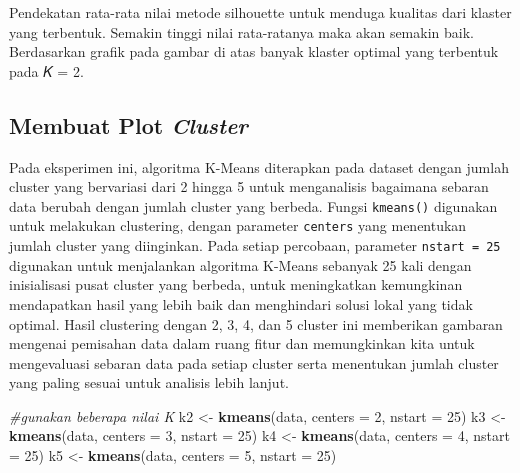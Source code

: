 \documentclass[
  oneside]{book}
\newenvironment{Shaded}{\begin{snugshade}}{\end{snugshade}}
\newcommand{\AttributeTok}[1]{\textcolor[rgb]{0.13,0.29,0.53}{#1}}
\newcommand{\CommentTok}[1]{\textcolor[rgb]{0.56,0.35,0.01}{\textit{#1}}}
\newcommand{\DecValTok}[1]{\textcolor[rgb]{0.00,0.00,0.81}{#1}}
\newcommand{\FunctionTok}[1]{\textcolor[rgb]{0.13,0.29,0.53}{\textbf{#1}}}
\newcommand{\NormalTok}[1]{#1}
\newcommand{\OtherTok}[1]{\textcolor[rgb]{0.56,0.35,0.01}{#1}}
\begin{document}
Pendekatan rata-rata nilai metode silhouette untuk menduga kualitas dari klaster yang terbentuk. Semakin tinggi nilai rata-ratanya maka akan semakin baik. Berdasarkan grafik pada gambar di atas banyak klaster optimal yang terbentuk pada 𝐾 = 2.

\subsection*{\texorpdfstring{Membuat Plot \emph{Cluster}}{Membuat Plot Cluster}}\label{membuat-plot-cluster}

Pada eksperimen ini, algoritma K-Means diterapkan pada dataset dengan jumlah cluster yang bervariasi dari 2 hingga 5 untuk menganalisis bagaimana sebaran data berubah dengan jumlah cluster yang berbeda. Fungsi \texttt{kmeans()} digunakan untuk melakukan clustering, dengan parameter \texttt{centers} yang menentukan jumlah cluster yang diinginkan. Pada setiap percobaan, parameter \texttt{nstart\ =\ 25} digunakan untuk menjalankan algoritma K-Means sebanyak 25 kali dengan inisialisasi pusat cluster yang berbeda, untuk meningkatkan kemungkinan mendapatkan hasil yang lebih baik dan menghindari solusi lokal yang tidak optimal. Hasil clustering dengan 2, 3, 4, dan 5 cluster ini memberikan gambaran mengenai pemisahan data dalam ruang fitur dan memungkinkan kita untuk mengevaluasi sebaran data pada setiap cluster serta menentukan jumlah cluster yang paling sesuai untuk analisis lebih lanjut.

\begin{Shaded}
\begin{Highlighting}[]
\CommentTok{\#gunakan beberapa nilai K}
\NormalTok{k2 }\OtherTok{\textless{}{-}} \FunctionTok{kmeans}\NormalTok{(data, }\AttributeTok{centers =} \DecValTok{2}\NormalTok{, }\AttributeTok{nstart =} \DecValTok{25}\NormalTok{)}
\NormalTok{k3 }\OtherTok{\textless{}{-}} \FunctionTok{kmeans}\NormalTok{(data, }\AttributeTok{centers =} \DecValTok{3}\NormalTok{, }\AttributeTok{nstart =} \DecValTok{25}\NormalTok{)}
\NormalTok{k4 }\OtherTok{\textless{}{-}} \FunctionTok{kmeans}\NormalTok{(data, }\AttributeTok{centers =} \DecValTok{4}\NormalTok{, }\AttributeTok{nstart =} \DecValTok{25}\NormalTok{)}
\NormalTok{k5 }\OtherTok{\textless{}{-}} \FunctionTok{kmeans}\NormalTok{(data, }\AttributeTok{centers =} \DecValTok{5}\NormalTok{, }\AttributeTok{nstart =} \DecValTok{25}\NormalTok{)}
\end{Highlighting}
\end{Shaded}
\end{document}
